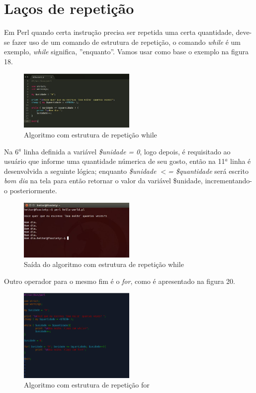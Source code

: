 \chapter{Laços de repeti\c{c}\~ao}

Em Perl quando certa instru\c{c}\~ao precisa ser repetida uma certa quantidade, deve-se fazer uso de um comando de estrutura de repeti\c{c}\~ao, o comando 
\textit{while} \'e um exemplo, \textit{while} significa, ''enquanto''. Vamos usar como base o exemplo na figura 18.

\begin{figure}[!htb]
	\centering
	\includegraphics[width=0.5\textwidth]{../5_figuras/image18}
	\caption{Algoritmo com estrutura de repeti\c{c}\~ao while}
\end{figure}

Na 6$^a$ linha definida a vari\'avel \textit{\$unidade = 0}, logo depois, \'e requisitado ao usu\'ario que informe uma quantidade n\'umerica de seu gosto, 
ent\~ao na 11$^a$ linha \'e desenvolvida a seguinte l\'ogica; enquanto \textit{\$unidade $<$= \$quantidade} ser\'a escrito \textit{bom dia} na tela para 
ent\~ao retornar o valor da vari\'avel \$unidade, incrementando-o posteriormente.

\begin{figure}[!htb]
	\centering
	\includegraphics[width=0.5\textwidth]{../5_figuras/image19}
	\caption{Sa\'ida do algoritmo com estrutura de repeti\c{c}\~ao while}
\end{figure}

Outro operador para o mesmo fim \'e o \textit{for}, como \'e apresentado na figura 20.

\begin{figure}[!htb]
	\centering
	\includegraphics[width=0.5\textwidth]{../5_figuras/image20}
	\caption{Algoritmo com estrutura de repeti\c{c}\~ao for}
\end{figure}

